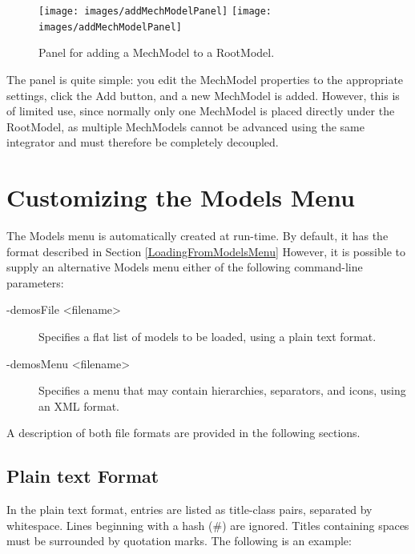 \documentclass{article}
\begin{document}
\begin{figure}
\begin{center}
\iflatexml
\texttt{[image: images/addMechModelPanel]}
\else
\texttt{[image: images/addMechModelPanel]}
\fi
\end{center}
\caption{Panel for adding a MechModel to a RootModel.}%
\label{addMechModelPanelFig}
\end{figure}

The panel is quite simple: you edit the MechModel properties to the
appropriate settings, click the {\sf Add} button, and a new MechModel is
added. However, this is of limited use, since normally only one
MechModel is placed directly under the RootModel, as multiple
MechModels cannot be advanced using the same integrator and must
therefore be completely decoupled.

\section{Customizing the Models Menu}
\label{CustomizingModelsMenu}

The \textsf{Models} menu is automatically created at run-time.  By
default, it has the format described in Section \ref{LoadingFromModelsMenu}
However, it is possible to supply an alternative {\sf Models} menu
either of the following command-line parameters:

\begin{description}

\item[-demosFile <filename>]
Specifies a flat list of models to be loaded, using a plain text
format.

\item[-demosMenu <filename>]
Specifies a menu that may contain hierarchies, separators, and icons,
using an XML format.

\end{description}

A description of both file formats are provided in the following sections.

\subsection{Plain text Format \label{sec:menu:plaintext}}

In the plain text format, entries are listed as title-class pairs, separated by
whitespace.  Lines beginning with a hash (\#) are ignored.  Titles containing
spaces must be surrounded by quotation marks.  The following is an example:
\end{document}
